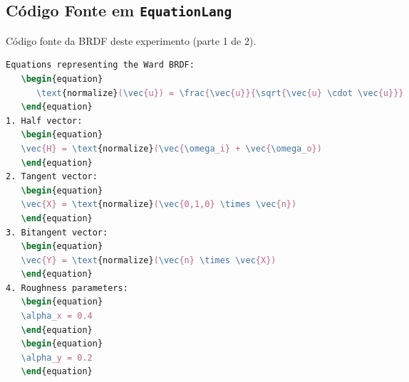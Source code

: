 \subsection{Código Fonte em \texttt{EquationLang}}
\begin{codigo}[H]
    \caption{\small Código fonte da BRDF deste experimento (parte 1 de 2).}
    \label{cod-ward-eqlang-pt-1}
\begin{lstlisting}[language=tex, frame=none, inputencoding=utf8]
Equations representing the Ward BRDF:
   \begin{equation}
      \text{normalize}(\vec{u}) = \frac{\vec{u}}{\sqrt{\vec{u} \cdot \vec{u}}}
   \end{equation}
1. Half vector:
   \begin{equation}
   \vec{H} = \text{normalize}(\vec{\omega_i} + \vec{\omega_o})
   \end{equation}
2. Tangent vector:
   \begin{equation}
   \vec{X} = \text{normalize}(\vec{0,1,0} \times \vec{n})
   \end{equation}
3. Bitangent vector:
   \begin{equation}
   \vec{Y} = \text{normalize}(\vec{n} \times \vec{X})
   \end{equation}
4. Roughness parameters:
   \begin{equation}
   \alpha_x = 0.4
   \end{equation}
   \begin{equation}
   \alpha_y = 0.2
   \end{equation}
\end{lstlisting}
\end{codigo}

